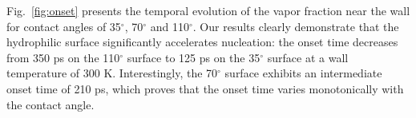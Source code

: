 Fig.~\ref{fig:onset} presents the temporal evolution of the vapor fraction near the wall for contact angles of 35$^\circ$, 70$^\circ$ and 110$^\circ$. Our results clearly demonstrate that the hydrophilic surface significantly accelerates nucleation: the onset time decreases from 350 ps on the 110$^\circ$ surface to 125 ps on the 35$^\circ$ surface at a wall temperature of 300 K. Interestingly, the 70$^\circ$ surface exhibits an intermediate onset time of 210 ps, which proves that the onset time varies monotonically with the contact angle.